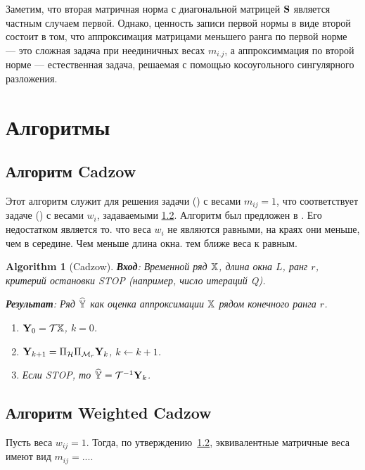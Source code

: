 \documentclass[12pt,a4paper,fleqn,leqno]{article}
\newtheorem{algorithm}{Algorithm}%
\begin{document}
Заметим, что вторая матричная норма с диагональной матрицей $\mathbf{S}$ является частным случаем первой.
Однако, ценность записи первой нормы в виде
второй состоит в том, что аппроксимация матрицами меньшего ранга по первой норме --- это сложная задача при неединичных весах
$m_{i.j}$, а аппроксиммация по второй норме --- естественная задача, решаемая с помощью косоугольного сингулярного разложения.

\section{Алгоритмы}

\subsection{Алгоритм Cadzow}
Этот алгоритм служит для решения задачи () с весами $m_{ij}=1$, что соответствует задаче
() с весами $w_i$, задаваемыми \ref{}.
Алгоритм был предложен в \cite{Cadzow1988}. Его недостатком является то. что веса $w_i$ не являются равными,
на краях они меньше, чем в середине. Чем меньше длина окна. тем ближе веса к равным.

\begin{algorithm}[Cadzow]
\textbf{Вход}: Временной ряд $\mathbb{X}$, длина окна $L$, ранг $r$,
критерий остановки STOP (например, число итераций Q).

\textbf{Результат}:
Ряд $\widehat{\mathbb{Y}}$ как оценка аппроксимации $\mathbb{X}$ рядом конечного ранга $r$.

\begin{enumerate}
\item
$\mathbf{Y}_0 = \mathcal{T} \mathbb{X}$, $k=0$.
\item
$\mathbf{Y}_{k+1} = \Pi_{\mathcal{H}}  \Pi_{\mathcal{M}_r} \mathbf{Y}_{k}$, $k\leftarrow k+1$.
\item
Если STOP, то $\widehat{\mathbb{Y}} = \mathcal{T}^{-1} \mathbf{Y}_k$.
\end{enumerate}
\end{algorithm}

\subsection{Алгоритм Weighted Cadzow}

Пусть веса $w_{ij}=1$. Тогда, по утверждению~\ref{}, эквивалентные матричные веса имеют вид $m_{ij}=...$.
\end{document}
